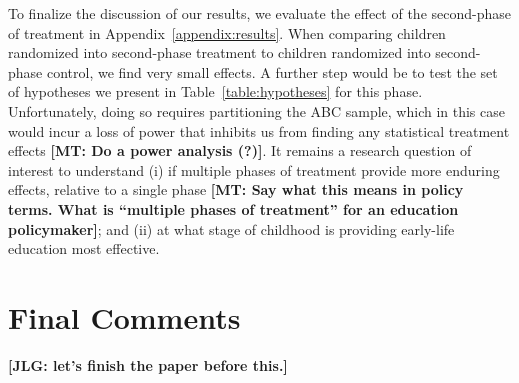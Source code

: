 



\noindent To finalize the discussion of our results, we evaluate the effect of the second-phase of treatment in Appendix~\ref{appendix:results}. When comparing children randomized into second-phase treatment to children randomized into second-phase control, we find very small effects. A further step would be to test the set of hypotheses we present in Table~\ref{table:hypotheses} for this phase. Unfortunately, doing so requires partitioning the ABC sample, which in this case would incur a loss of power that inhibits us from finding any statistical treatment effects \textbf{[MT: Do a power analysis (?)]}. It remains a research question of interest to understand (i) if multiple phases of treatment provide more enduring effects, relative to a single phase \textbf{[MT: Say what this means in policy terms. What is ``multiple phases of treatment'' for an education policymaker]}; and (ii) at what stage of childhood is providing early-life education most effective.

\section{Final Comments} \label{section:conclusion}

\noindent \textbf{[JLG: let's finish the paper before this.]}

\clearpage
\singlespace



 
